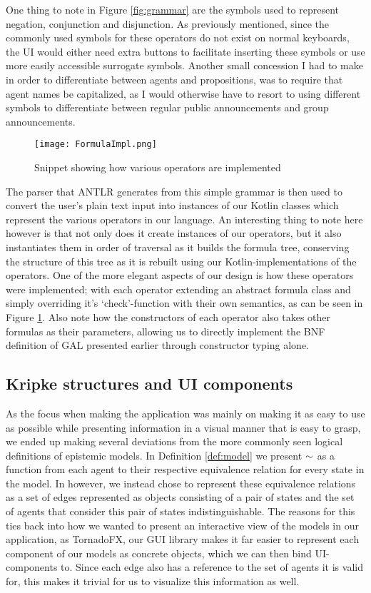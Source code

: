 One thing to note in Figure \ref{fig:grammar} are the symbols used to represent negation, conjunction and disjunction. As previously mentioned, since the commonly used symbols for these operators do not exist on normal keyboards, the UI would either need extra buttons to facilitate inserting these symbols or use more easily accessible surrogate symbols. Another small concession I had to make in order to differentiate between agents and propositions, was to require that agent names be capitalized, as I would otherwise have to resort to using different symbols to differentiate between regular public announcements and group announcements. 

\begin{figure}[h]
	\texttt{[image: FormulaImpl.png]}
	\caption{Snippet showing how various operators are implemented}
	\label{fig:formulaImpl}
\end{figure}

The parser that ANTLR generates from this simple grammar is then used to convert the user's plain text input into instances of our Kotlin classes which represent the various operators in our language. An interesting thing to note here however is that not only does it create instances of our operators, but it also instantiates them in order of traversal as it builds the formula tree, conserving the structure of this tree as it is rebuilt using our Kotlin-implementations of the operators. One of the more elegant aspects of our design is how these operators were implemented; with each operator extending an abstract formula class and simply overriding it's `check'-function with their own semantics, as can be seen in Figure \ref{fig:formulaImpl}. Also note how the constructors of each operator also takes other formulas as their parameters, allowing us to directly implement the BNF definition of GAL presented earlier through constructor typing alone.

\subsection{Kripke structures and UI components}

As the focus when making the application was mainly on making it as easy to use as possible while presenting information in a visual manner that is easy to grasp, we ended up making several deviations from the more commonly seen logical definitions of epistemic models. In Definition \ref{def:model} we present $\sim$ as a function from each agent to their respective equivalence relation for every state in the model. In \cname{} however, we instead chose to represent these equivalence relations as a set of edges represented as objects consisting of a pair of states and the set of agents that consider this pair of states indistinguishable. The reasons for this ties back into how we wanted to present an interactive view of the models in our application, as TornadoFX, our GUI library makes it far easier to represent each component of our models as concrete objects, which we can then bind UI-components to. Since each edge also has a reference to the set of agents it is valid for, this makes it trivial for us to visualize this information as well. 

